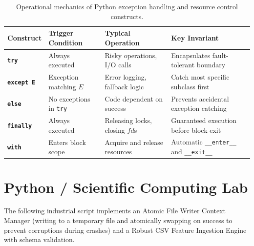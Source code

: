 \begin{table}[htbp]
\centering
\small
\begin{tabular}{p{2.2cm} p{2.6cm} p{3.2cm} p{4.2cm}}
\hline
\textbf{Construct} & \textbf{Trigger Condition} & \textbf{Typical Operation} & \textbf{Key Invariant} \\
\hline
\textbf{\texttt{try}} & Always executed & Risky operations, I/O calls & Encapsulates fault-tolerant boundary \\
\textbf{\texttt{except E}} & Exception matching $E$ & Error logging, fallback logic & Catch most specific subclass first \\
\textbf{\texttt{else}} & No exceptions in \texttt{try} & Code dependent on success & Prevents accidental exception catching \\
\textbf{\texttt{finally}} & Always executed & Releasing locks, closing $fd$s & Guaranteed execution before block exit \\
\textbf{\texttt{with}} & Enters block scope & Acquire and release resources & Automatic \texttt{\_\_enter\_\_} and \texttt{\_\_exit\_\_} \\
\hline
\end{tabular}
\caption{Operational mechanics of Python exception handling and resource control constructs.}
\label{tab:exception_taxonomy}
\end{table}

\section{Python / Scientific Computing Lab}

The following industrial script implements an Atomic File Writer Context Manager (writing to a temporary file and atomically swapping on success to prevent corruptions during crashes) and a Robust CSV Feature Ingestion Engine with schema validation.

